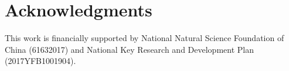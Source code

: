 \section{Acknowledgments}

This work is financially supported by National Natural Science Foundation of China (61632017) and National Key Research and Development Plan (2017YFB1001904).